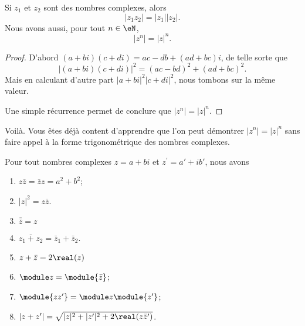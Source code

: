 \begin{proposition} \label{PROPooXLARooYSDCsF}
	Si \( z_1\) et \( z_2\) sont des nombres complexes, alors
	\begin{equation}
		| z_1z_2 |=| z_1 | |z_2 |.
	\end{equation}
	Nous avons aussi, pour tout \( n\in \eN\),
	\begin{equation}       \label{EQooATTQooRpJeCo}
		| z^n |=| z |^n.
	\end{equation}
\end{proposition}

\begin{proof}
	D'abord \( (a+bi)(c+di)=ac-db+(ad+bc)i\), de telle sorte que
	\begin{equation}
		| (a+bi)(c+di) |^2=(ac-bd)^2+(ad+bc)^2.
	\end{equation}
	Mais en calculant d'autre part \( | a+bi |^2| c+di |^2\), nous tombons sur la même valeur.

	Une simple récurrence permet de conclure que \( | z^n |=| z |^n\).
\end{proof}
Voilà. Vous êtes déjà content d'apprendre que l'on peut démontrer \( | z^n |=| z |^n\) sans faire appel à la forme trigonométrique des nombres complexes.


\begin{proposition}     \label{PROPooUMVGooIrhZZg}
	Pour tout nombres complexes \( z = a+bi\) et \( z^\prime=a'+ib'\), nous avons
	\begin{enumerate}
		\item       \label{ITEMooYBJVooGXiDSd}
		      \( z \bar z =\bar z z = a^2 + b^2\);
		\item	\label{ITEMooKIDXooYANMUz}
		      \( | z |^2=z\bar z\).
		\item       \label{ITEMooCGLSooKHbzkn}
		      \( \bar{\bar{z}} = z\)
		\item		\label{ITEMooYXVXooObkeTM}
		      \( \overline{z_1+z_2}=\bar z_1+\bar z_2\).
		\item		\label{ITEMooGVWGooPQBUHC}
		      \( z+\bar z=2\real(z)\)
		\item       \label{ITEMooDKWDooUjEuZA}
		      \( \module z = \module {\bar z}\);
		\item       \label{ITEMooFXKYooUOXbwH}
		      \( \module{zz^\prime} = \module z \module{z^\prime}\);
		\item     \label{ITEMooUJHPooUFdvqB}
		      \( | z+z' |=\sqrt{ | z |^2+| z' |^2+2\real(z\bar z') }\).


	\end{enumerate}
\end{proposition}


